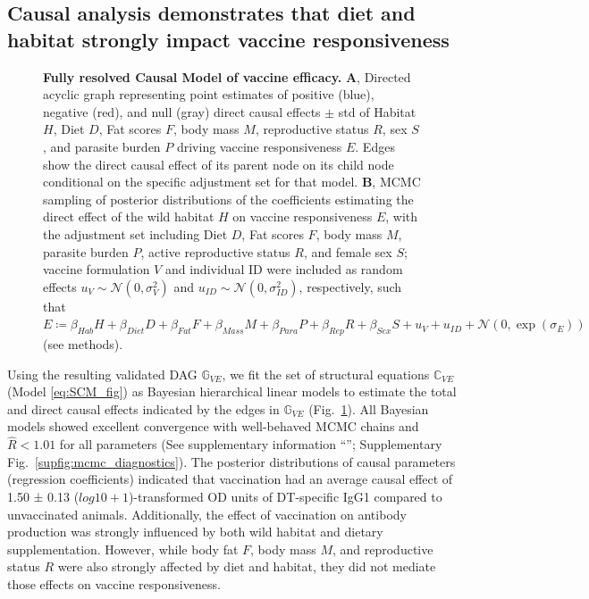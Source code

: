 \documentclass[a4paper, hidelinks, 11pt]{article}
\begin{document}
\subsection{Causal analysis demonstrates that diet and habitat strongly impact vaccine responsiveness}

\begin{figure}[htbp]
	\centering
	
	\caption{\textbf{Fully resolved Causal Model of vaccine efficacy.} \textbf{A}, Directed acyclic graph representing point estimates of positive (blue), negative (red), and null (gray) direct causal effects $\pm$ std of Habitat $H$, Diet $D$, Fat scores $F$, body mass $M$, reproductive status $R$, sex $S$, and parasite burden $P$ driving vaccine responsiveness \(E\). Edges show the direct causal effect of its parent node on its child node conditional on the specific adjustment set for that model. \textbf{B}, MCMC sampling of posterior distributions of the coefficients estimating the direct effect of the wild habitat \(H\) on vaccine responsiveness \(E\), with the adjustment set including Diet \(D\), Fat scores \(F\), body mass \(M\), parasite burden \(P\), active reproductive status \(R\), and female sex \(S\); vaccine formulation \(V\) and individual ID were included as random effects \(u_V \sim \mathcal{N}(0, \sigma_V^2)\) and \(u_{ID} \sim \mathcal{N}(0, \sigma_{ID}^2)\), respectively, such that\\ \(E \coloneq \beta_{Hab}H + \beta_{Diet}D + \beta_{Fat}F + \beta_{Mass}M + \beta_{Para}P + \beta_{Rep}R + \beta_{Sex}S + u_V + u_{ID} + \mathcal{N}(0, \exp(\sigma_E))\) \\ (see  methods).}
	\label{fig:DAGtikzParam}
\end{figure}

Using the resulting validated DAG $\mathbb{G}_{VE}$, we fit the set of structural equations $\mathbb{C}_{VE}$ (Model \ref{eq:SCM_fig}) as Bayesian hierarchical linear models to estimate the total and direct causal effects indicated by the edges in $\mathbb{G}_{VE}$ (Fig.~\ref{fig:DAGtikzParam}).
All Bayesian models showed excellent convergence with well-behaved MCMC chains and $\hat{R} < 1.01$ for all parameters (See supplementary information ``''; Supplementary Fig.~\ref{supfig:mcmc_diagnostics}). The posterior distributions of causal parameters (regression coefficients) indicated that vaccination had an average causal effect of 1.50 ± 0.13 (\(log10 + 1\))-transformed OD units of DT-specific IgG1 compared to unvaccinated animals. Additionally, the effect of vaccination on antibody production was strongly influenced by both wild habitat and dietary supplementation. However, while body fat \(F\), body mass \(M\), and reproductive status \(R\) were also strongly affected by diet and habitat, they did not mediate those effects on vaccine responsiveness.
\end{document}
